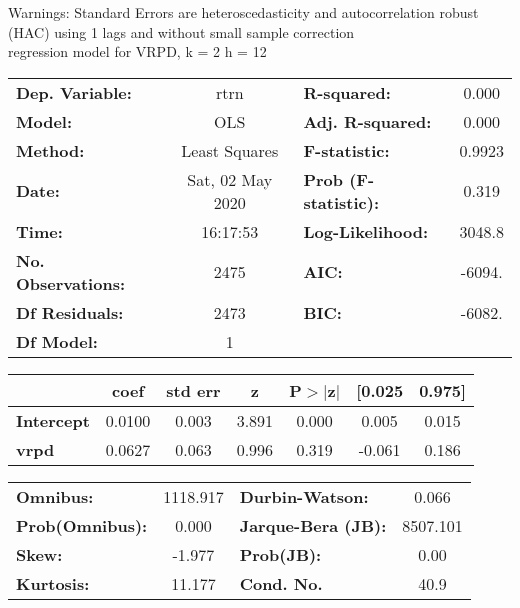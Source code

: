 Warnings: \newline
 [1] Standard Errors are heteroscedasticity and autocorrelation robust (HAC) using 1 lags and without small sample correction\\ 

regression model for VRPD, k = 2 h = 12\begin{center}
\begin{tabular}{lclc}
\toprule
\textbf{Dep. Variable:}    &       rtrn       & \textbf{  R-squared:         } &     0.000   \\
\textbf{Model:}            &       OLS        & \textbf{  Adj. R-squared:    } &     0.000   \\
\textbf{Method:}           &  Least Squares   & \textbf{  F-statistic:       } &    0.9923   \\
\textbf{Date:}             & Sat, 02 May 2020 & \textbf{  Prob (F-statistic):} &    0.319    \\
\textbf{Time:}             &     16:17:53     & \textbf{  Log-Likelihood:    } &    3048.8   \\
\textbf{No. Observations:} &        2475      & \textbf{  AIC:               } &    -6094.   \\
\textbf{Df Residuals:}     &        2473      & \textbf{  BIC:               } &    -6082.   \\
\textbf{Df Model:}         &           1      & \textbf{                     } &             \\
\bottomrule
\end{tabular}
\begin{tabular}{lcccccc}
                   & \textbf{coef} & \textbf{std err} & \textbf{z} & \textbf{P$> |$z$|$} & \textbf{[0.025} & \textbf{0.975]}  \\
\midrule
\textbf{Intercept} &       0.0100  &        0.003     &     3.891  &         0.000        &        0.005    &        0.015     \\
\textbf{vrpd}      &       0.0627  &        0.063     &     0.996  &         0.319        &       -0.061    &        0.186     \\
\bottomrule
\end{tabular}
\begin{tabular}{lclc}
\textbf{Omnibus:}       & 1118.917 & \textbf{  Durbin-Watson:     } &    0.066  \\
\textbf{Prob(Omnibus):} &   0.000  & \textbf{  Jarque-Bera (JB):  } & 8507.101  \\
\textbf{Skew:}          &  -1.977  & \textbf{  Prob(JB):          } &     0.00  \\
\textbf{Kurtosis:}      &  11.177  & \textbf{  Cond. No.          } &     40.9  \\
\bottomrule
\end{tabular}
\end{center}


